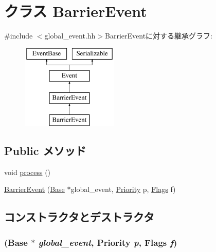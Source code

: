 \hypertarget{classGlobalSyncEvent_1_1BarrierEvent}{
\section{クラス BarrierEvent}
\label{classGlobalSyncEvent_1_1BarrierEvent}
}


{\ttfamily \#include $<$global\_\-event.hh$>$}BarrierEventに対する継承グラフ:\begin{figure}[H]
\begin{center}
\leavevmode
\includegraphics[height=4cm]{classGlobalSyncEvent_1_1BarrierEvent}
\end{center}
\end{figure}
\subsection*{Public メソッド}
\begin{DoxyCompactItemize}
\item 
void \hyperlink{classGlobalSyncEvent_1_1BarrierEvent_a2e9c5136d19b1a95fc427e0852deab5c}{process} ()
\item 
\hyperlink{classGlobalSyncEvent_1_1BarrierEvent_a6ebac12bc5ce36b50ab0dcb9bbb73235}{BarrierEvent} (\hyperlink{classBaseGlobalEventTemplate}{Base} $\ast$global\_\-event, \hyperlink{classEventBase_a6d92f7ee8144a5911ed46d85a89a4934}{Priority} p, \hyperlink{classFlags}{Flags} f)
\end{DoxyCompactItemize}


\subsection{コンストラクタとデストラクタ}
\hypertarget{classGlobalSyncEvent_1_1BarrierEvent_a6ebac12bc5ce36b50ab0dcb9bbb73235}{
\subsubsection[{BarrierEvent}]{ ({\bf Base} $\ast$ {\em global\_\-event}, \/  {\bf Priority} {\em p}, \/  {\bf Flags} {\em f})}}
\label{classGlobalSyncEvent_1_1BarrierEvent_a6ebac12bc5ce36b50ab0dcb9bbb73235}



